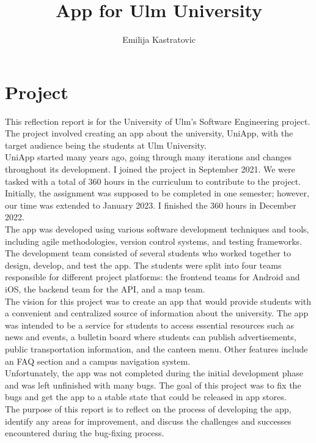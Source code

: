 \documentclass[sf-font,usefira,english]{uulm/sp/article}
\title{App for Ulm University}
\author{Emilija Kastratovic}
\begin{document}
\maketitle

\section{Project}

This reflection report is for the University of Ulm’s Software Engineering project.\\

The project involved creating an app about the university, UniApp, with the target audience being the students at Ulm University.\\

UniApp started many years ago, going through many iterations and changes throughout its development.
I joined the project in September 2021.
We were tasked with a total of 360 hours in the curriculum to contribute to the project.
Initially, the assignment was supposed to be completed in one semester; 
however, our time was extended to January 2023. 
I finished the 360 hours in December 2022.\\

The app was developed using various software development techniques and tools, including agile methodologies, version control systems, and testing frameworks. 
The development team consisted of several students who worked together to design, develop, and test the app. 
The students were split into four teams responsible for different project platforms: 
the frontend teams for Android and iOS, the backend team for the API, and a map team.\\

The vision for this project was to create an app that would provide students with a convenient and centralized source of information about the university. 
The app was intended to be a service for students to access essential resources such as news and events, a bulletin board where students can publish advertisements, public transportation information, and the canteen menu.
Other features include an FAQ section and a campus navigation system.\\

Unfortunately, the app was not completed during the initial development phase and was left unfinished with many bugs.
The goal of this project was to fix the bugs and get the app to a stable state that could be released in app stores.\\
The purpose of this report is to reflect on the process of developing the app, identify any areas for improvement, and discuss the challenges and successes encountered during the bug-fixing process.
\end{document}
